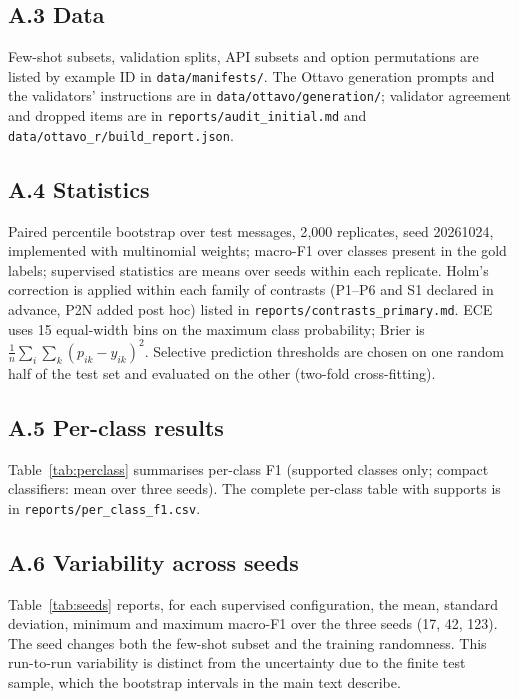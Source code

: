 \subsection*{A.3 Data}
Few-shot subsets, validation splits, API subsets and option permutations are listed by example ID in \nolinkurl{data/manifests/}. The
Ottavo generation prompts and the validators' instructions are in \nolinkurl{data/ottavo/generation/}; validator agreement and dropped
items are in \nolinkurl{reports/audit_initial.md} and \nolinkurl{data/ottavo_r/build_report.json}.

\subsection*{A.4 Statistics}
Paired percentile bootstrap over test messages, 2{,}000 replicates, seed 20261024, implemented with multinomial weights; macro-F1 over
classes present in the gold labels; supervised statistics are means over seeds within each replicate. Holm's correction is applied
within each family of contrasts (P1--P6 and S1 declared in advance, P2N added post hoc) listed in \nolinkurl{reports/contrasts_primary.md}. ECE uses 15 equal-width bins on the maximum class probability;
Brier is $\frac{1}{n}\sum_i\sum_k (p_{ik}-y_{ik})^2$. Selective prediction thresholds are chosen on one random half of the test set and
evaluated on the other (two-fold cross-fitting).

\subsection*{A.5 Per-class results}
\label{app:perclass}
Table~\ref{tab:perclass} summarises per-class F1 (supported classes only; compact classifiers: mean over three seeds). The complete
per-class table with supports is in \nolinkurl{reports/per_class_f1.csv}.

\subsection*{A.6 Variability across seeds}
Table~\ref{tab:seeds} reports, for each supervised configuration, the mean, standard deviation, minimum and maximum macro-F1 over the
three seeds (17, 42, 123). The seed changes both the few-shot subset and the training randomness. This run-to-run variability is distinct
from the uncertainty due to the finite test sample, which the bootstrap intervals in the main text describe.

\begin{table}[!htbp]
\centering\scriptsize
\caption{Macro-F1 across the three seeds.}
\label{tab:seeds}

\end{table}

\begin{table}[!htbp]
\centering\footnotesize
\caption{Per-class F1: median, 10th percentile, minimum, number of classes below 0.5 and the three weakest classes (all data for
compact classifiers; zero-shot with descriptions for decision models).}
\label{tab:perclass}

\end{table}
